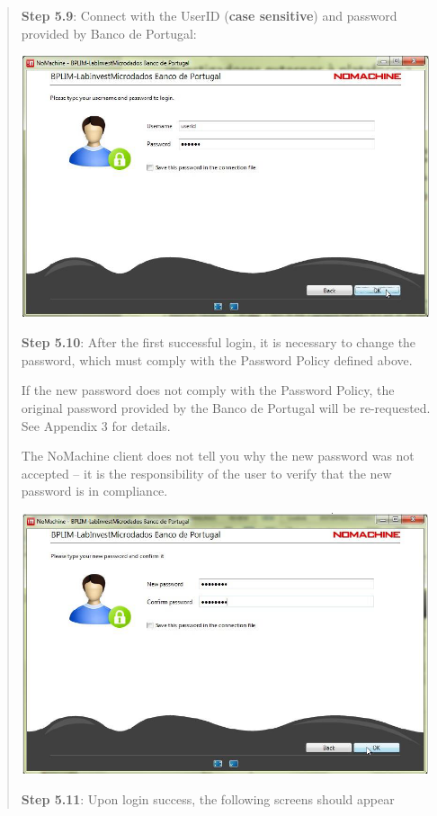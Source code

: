 \documentclass[
  11pt,
  a4paper,
]{article}
\begin{document}
\begin{quote}
\textbf{Step 5.9}: Connect with the UserID (\textbf{case sensitive}) and
password provided by Banco de Portugal:

\includegraphics[width=4.72441in,height=3.03504in]{./media/image34.png}

\textbf{Step 5.10}: After the first successful login, it is necessary to
change the password, which must comply with the Password Policy defined
above.

If the new password does not comply with the Password Policy, the
original password provided by the Banco de Portugal will be
re-requested. See Appendix 3 for details.

The NoMachine client does not tell you why the new password was not
accepted -- it is the responsibility of the user to verify that the new
password is in compliance.

\includegraphics[width=4.72441in,height=3.02972in]{./media/image35.png}

\textbf{Step 5.11}: Upon login success, the following screens should
appear


\end{quote}
\end{document}
